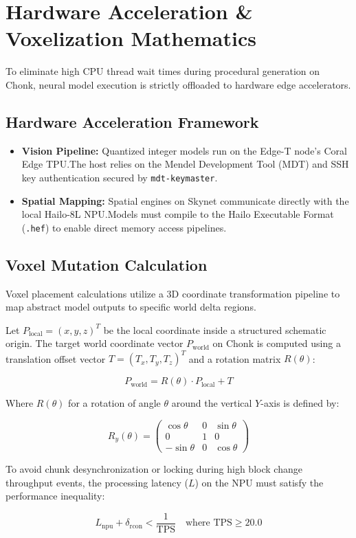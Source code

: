 \chapter{Hardware Acceleration \& Voxelization Mathematics}

To eliminate high CPU thread wait times during procedural generation on Chonk, neural model execution is strictly offloaded to hardware edge accelerators.

\section{Hardware Acceleration Framework}
\begin{itemize}
    \item \textbf{Vision Pipeline:} Quantized integer models run on the Edge-T node's Coral Edge TPU.\@ The host relies on the Mendel Development Tool (MDT) and SSH key authentication secured by \texttt{mdt-keymaster}.
    \item \textbf{Spatial Mapping:} Spatial engines on Skynet communicate directly with the local Hailo-8L NPU.\@ Models must compile to the Hailo Executable Format (\texttt{.hef}) to enable direct memory access pipelines.
\end{itemize}

\section{Voxel Mutation Calculation}
Voxel placement calculations utilize a 3D coordinate transformation pipeline to map abstract model outputs to specific world delta regions.

Let $P_{\text{local}} = (x, y, z)^T$ be the local coordinate inside a structured schematic origin. The target world coordinate vector $P_{\text{world}}$ on Chonk is computed using a translation offset vector $T = (T_x, T_y, T_z)^T$ and a rotation matrix $R(\theta)$:

\begin{equation}
    P_{\text{world}} = R(\theta) \cdot P_{\text{local}} + T
\end{equation}

Where $R(\theta)$ for a rotation of angle $\theta$ around the vertical $Y$-axis is defined by:

\begin{equation}
    R_y(\theta) = \begin{pmatrix}
        \cos\theta & 0 & \sin\theta \\
        0          & 1 & 0          \\
        -\sin\theta & 0 & \cos\theta
    \end{pmatrix}
\end{equation}

To avoid chunk desynchronization or locking during high block change throughput events, the processing latency ($L$) on the NPU must satisfy the performance inequality:

\begin{equation}
    L_{\text{npu}} + \delta_{\text{rcon}} < \frac{1}{\text{TPS}} \quad \text{where } \text{TPS} \ge 20.0
\end{equation}